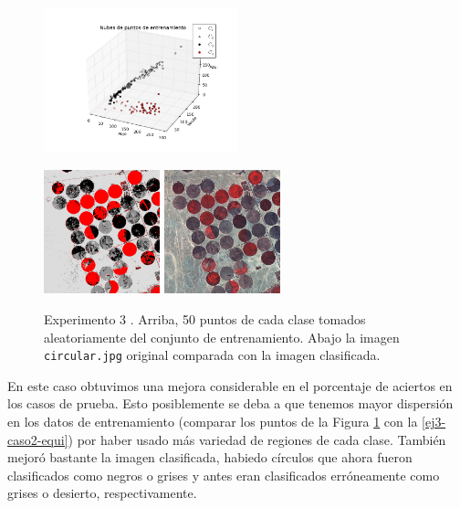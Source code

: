 \documentclass[a4paper,11pt]{article}
\begin{document}
\begin{figure}[h!]
\centering
\includegraphics[width=0.5\textwidth]{img/ej3-caso3-equi-puntos.png}

\includegraphics[width=0.3\textwidth]{img/ej3-caso3-equi-clasif.png}
\includegraphics[width=0.3\textwidth]{img/circular.jpg}
\caption{Experimento 3%
. Arriba, 50 puntos de cada clase tomados aleatoriamente del conjunto de entrenamiento. Abajo la imagen {\tt circular.jpg} original comparada con la imagen clasificada.}
\label{ej3-caso3-equi}
\end{figure}

En este caso obtuvimos una mejora considerable en el porcentaje de aciertos en los casos de prueba. Esto posiblemente se deba a que tenemos mayor dispersión en los datos de entrenamiento (comparar los puntos de la Figura \ref{ej3-caso3-equi} con la \ref{ej3-caso2-equi}) por haber usado más variedad de regiones de cada clase. También mejoró bastante la imagen clasificada, habiedo círculos que ahora fueron clasificados como negros o grises y antes eran clasificados erróneamente como grises o desierto, respectivamente.
\end{document}
